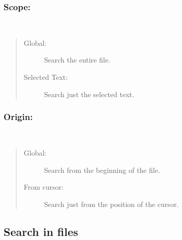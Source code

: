 \subsubsection{Scope:}\\
\begin{quote}
  \begin{footnotesize}
    \begin{description}
      \item[Global:]
        Search the entire file.
      \item[Selected Text:]
        Search just the selected text.
    \end{description}
  \end{footnotesize}
\end{quote}

\subsubsection{Origin:}\\
\begin{quote}
  \begin{footnotesize}
    \begin{description}
      \item[Global:]
        Search from the beginning of the file.
      \item[From cursor:]
        Search just from the position of the cursor.
    \end{description}
  \end{footnotesize}
\end{quote}


\hypertarget{dlg_search_in_files}{}
\subsection{Search in files}


